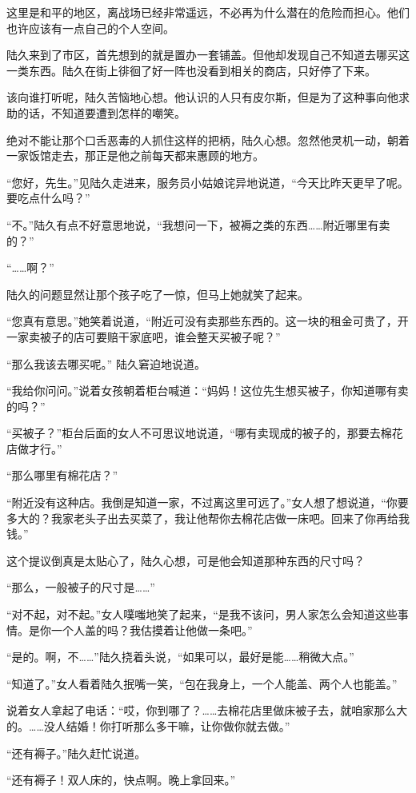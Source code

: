 这里是和平的地区，离战场已经非常遥远，不必再为什么潜在的危险而担心。他们也许应该有一点自己的个人空间。

陆久来到了市区，首先想到的就是置办一套铺盖。但他却发现自己不知道去哪买这一类东西。陆久在街上徘徊了好一阵也没看到相关的商店，只好停了下来。

该向谁打听呢，陆久苦恼地心想。他认识的人只有皮尔斯，但是为了这种事向他求助的话，不知道要遭到怎样的嘲笑。

绝对不能让那个口舌恶毒的人抓住这样的把柄，陆久心想。忽然他灵机一动，朝着一家饭馆走去，那正是他之前每天都来惠顾的地方。

“您好，先生。”见陆久走进来，服务员小姑娘诧异地说道，“今天比昨天更早了呢。要吃点什么吗？”

“不。”陆久有点不好意思地说，“我想问一下，被褥之类的东西……附近哪里有卖的？”

“……啊？”

陆久的问题显然让那个孩子吃了一惊，但马上她就笑了起来。

“您真有意思。”她笑着说道，“附近可没有卖那些东西的。这一块的租金可贵了，开一家卖被子的店可要赔干家底吧，谁会整天买被子呢？”

“那么我该去哪买呢。” 陆久窘迫地说道。

“我给你问问。”说着女孩朝着柜台喊道：“妈妈！这位先生想买被子，你知道哪有卖的吗？”

“买被子？”柜台后面的女人不可思议地说道，“哪有卖现成的被子的，那要去棉花店做才行。”

“那么哪里有棉花店？”

“附近没有这种店。我倒是知道一家，不过离这里可远了。”女人想了想说道，“你要多大的？我家老头子出去买菜了，我让他帮你去棉花店做一床吧。回来了你再给我钱。”

这个提议倒真是太贴心了，陆久心想，可是他会知道那种东西的尺寸吗？

“那么，一般被子的尺寸是……”

“对不起，对不起。”女人噗嗤地笑了起来，“是我不该问，男人家怎么会知道这些事情。是你一个人盖的吗？我估摸着让他做一条吧。”

“是的。啊，不……”陆久挠着头说，“如果可以，最好是能……稍微大点。”

“知道了。”女人看着陆久抿嘴一笑，“包在我身上，一个人能盖、两个人也能盖。”

说着女人拿起了电话：“哎，你到哪了？……去棉花店里做床被子去，就咱家那么大的。……没人结婚！你打听那么多干嘛，让你做你就去做。”

“还有褥子。”陆久赶忙说道。

“还有褥子！双人床的，快点啊。晚上拿回来。”

